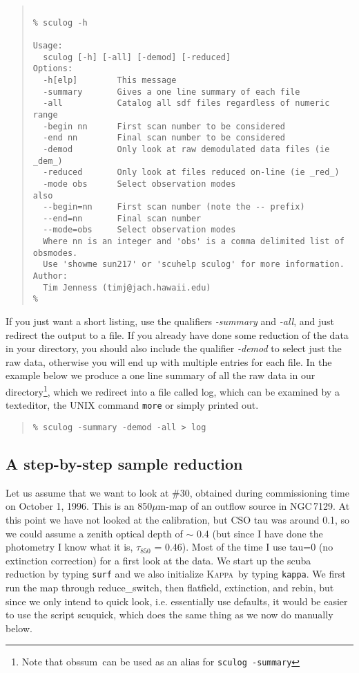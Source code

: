 \documentclass[twoside,11pt]{article}
\newenvironment{myquote}{\begin{quote}\begin{small}}{\end{small}\end{quote}}
\newcommand{\Kappa}{\xref{\textsc{Kappa}}{sun95}{}}
\newcommand{\task}[1]{\textsf{#1}}
\newcommand{\rebin}{\xref{\task{rebin}}{sun216}{REBIN}}
\newcommand{\resw}{\xref{\task{reduce\_switch}}{sun216}{REDUCE_SWITCH}}
\newcommand{\flatf}{\xref{\task{flatfield}}{sun216}{FLATFIELD}}
\newcommand{\ext}{\xref{\task{extinction}}{sun216}{EXTINCTION}}
\newcommand{\scuquick}{\xref{\task{scuquick}}{sun216}{SCUQUICK}}
\newcommand{\sculog}{\xref{\task{sculog}}{sun216}{SCULOG}}
\newcommand{\obssum}{\xref{\task{obssum}}{sun216}{OBSSUM}}
\newcommand{\xref}[3]{#1}
\newcommand{\xlabel}[1]{}
\begin{document}
\begin{myquote} \begin{verbatim}

% sculog -h
 
Usage: 
  sculog [-h] [-all] [-demod] [-reduced]
Options:
  -h[elp]        This message
  -summary       Gives a one line summary of each file
  -all           Catalog all sdf files regardless of numeric range
  -begin nn      First scan number to be considered
  -end nn        Final scan number to be considered
  -demod         Only look at raw demodulated data files (ie _dem_)
  -reduced       Only look at files reduced on-line (ie _red_)
  -mode obs      Select observation modes
also
  --begin=nn     First scan number (note the -- prefix)
  --end=nn       Final scan number
  --mode=obs     Select observation modes
  Where nn is an integer and 'obs' is a comma delimited list of obsmodes.
  Use 'showme sun217' or 'scuhelp sculog' for more information.
Author:
  Tim Jenness (timj@jach.hawaii.edu)
% 
\end{verbatim} \end{myquote} 

If you just want a short listing, use the qualifiers {\it -summary} and {\it
-all}, and just redirect the output to a file. If you already have done some
reduction of the data in your directory, you should also include the qualifier
{\it -demod} to select just the raw data, otherwise you will end up with
multiple entries for each file. In the example below we produce a one line
summary of all the raw data in our directory\footnote{Note that \obssum\ can
be used as an alias for \texttt{\sculog\ -summary}}, which we redirect into a
file called log, which can be examined by a texteditor, the UNIX command 
\texttt{more} or simply printed out.

\begin{myquote} \begin{verbatim}
% sculog -summary -demod -all > log
\end{verbatim} \end{myquote}
 
\subsection{\xlabel{a_step-by-step_sample_reduction}A step-by-step sample reduction}

Let us assume that we want to look at \#30, obtained during commissioning time
on October 1, 1996. This is an 850{$\mu$m}-map of an outflow source in
NGC\,7129. At this point we have not looked at the calibration, but CSO tau was
around 0.1, so we could assume a zenith optical depth of $\sim$ 0.4 (but since
I have done the photometry I know what it is, $\tau_{850}$ = 0.46). Most of
the time I use tau=0 (no extinction correction) for a first look at the
data. We start up the scuba reduction by typing \texttt{surf} and we also
initialize \Kappa\ by typing \texttt{kappa}. We first run the map through
\resw, then \flatf, \ext, and \rebin, but since we only intend to quick look,
i.e. essentially use defaults, it would be easier to use the script
\scuquick, which does the same thing as we now do manually below.
\end{document}
